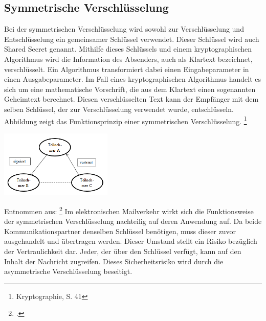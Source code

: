 \documentclass  [paper=a4,
				fontsize=12pt,
				listof=totoc,
				bibliography=totoc
				]{scrreprt}
\begin{document}
			\subsection{Symmetrische Verschlüsselung}
				Bei der symmetrischen Verschlüsselung wird sowohl zur Verschlüsselung und Entschlüsselung ein gemeinsamer Schlüssel verwendet. Dieser Schlüssel wird auch Shared Secret genannt. Mithilfe dieses Schlüssels und einem kryptographischen Algorithmus wird die Information des Absenders, auch als Klartext bezeichnet, verschlüsselt. Ein Algorithmus transformiert dabei einen Eingabeparameter in einen Ausgabeparameter. Im Fall eines kryptographischen Algorithmus handelt es sich um eine mathematische Vorschrift, die aus dem Klartext einen sogenannten Geheimtext berechnet. Diesen verschlüsselten Text kann der Empfänger mit dem selben Schlüssel, der zur Verschlüsselung verwendet wurde, entschlüsseln. Abbildung  zeigt das Funktionsprinzip einer symmetrischen Verschlüsselung.
				\footnote{Kryptographie, S. 41}
				\begin{center}
					\includegraphics[width=0.4\textwidth]{images/WOT.png}
				\end{center}
				Entnommen aus: \footcite[S. 41]{Schmeh2013}
				Im elektronischen Mailverkehr wirkt sich die Funktionsweise der symmetrischen Verschlüsselung nachteilig auf deren Anwendung auf. Da beide Kommunikationspartner denselben Schlüssel benötigen, muss dieser zuvor ausgehandelt und übertragen werden. Dieser Umstand stellt ein Risiko bezüglich der Vertraulichkeit dar. Jeder, der über den Schlüssel verfügt, kann auf den Inhalt der Nachricht zugreifen. Dieses Sicherheitsrisiko wird durch die asymmetrische Verschlüsselung beseitigt.
\end{document}
